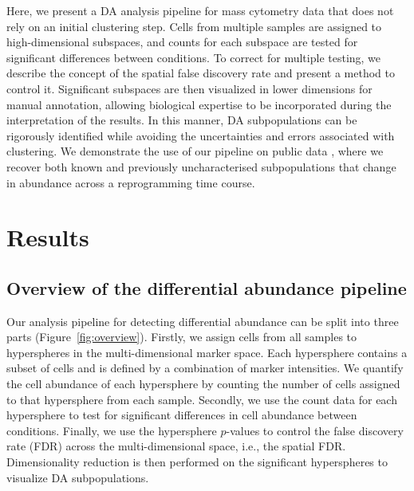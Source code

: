 \documentclass{article}
\begin{document}

Here, we present a DA analysis pipeline for mass cytometry data that does not rely on an initial clustering step.
Cells from multiple samples are assigned to high-dimensional subspaces, and counts for each subspace are tested for significant differences between conditions.
To correct for multiple testing, we describe the concept of the spatial false discovery rate and present a method to control it.
Significant subspaces are then visualized in lower dimensions for manual annotation, allowing biological expertise to be incorporated during the interpretation of the results.
In this manner, DA subpopulations can be rigorously identified while avoiding the uncertainties and errors associated with clustering.
We demonstrate the use of our pipeline on public data \cite{zunder2015continuous}, where we recover both known and previously uncharacterised subpopulations that change in abundance across a reprogramming time course.

\section{Results}
\subsection{Overview of the differential abundance pipeline}
Our analysis pipeline for detecting differential abundance can be split into three parts (Figure~\ref{fig:overview}). 
Firstly, we assign cells from all samples to hyperspheres in the multi-dimensional marker space.
Each hypersphere contains a subset of cells and is defined by a combination of marker intensities.
We quantify the cell abundance of each hypersphere by counting the number of cells assigned to that hypersphere from each sample.
Secondly, we use the count data for each hypersphere to test for significant differences in cell abundance between conditions.
Finally, we use the hypersphere $p$-values to control the false discovery rate (FDR) across the multi-dimensional space, i.e., the spatial FDR.
Dimensionality reduction is then performed on the significant hyperspheres to visualize DA subpopulations.
\end{document}

